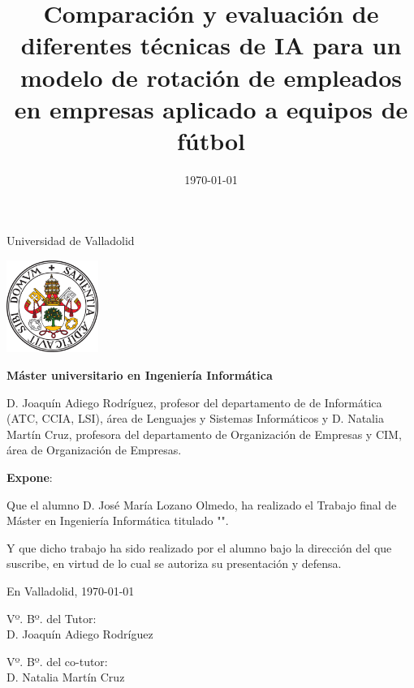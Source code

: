 \documentclass[a4paper,12pt,oneside,oldfontcommands]{memoir}
\title{Comparación y evaluación de diferentes técnicas de IA para un modelo de rotación de empleados en empresas aplicado a equipos de fútbol}
\author{\nombre}
\date{\today}
\newcommand{\nombre}[0]{José María Lozano Olmedo} %
\begin{document}
\maketitle


\newpage\null\thispagestyle{empty}\newpage


\thispagestyle{empty}


\noindent
\begin{center}%
	{\noindent\Huge Universidad de Valladolid}\vspace{.5cm}%
	
\begin{center}%
	\includegraphics[height=3cm]{img/escudoUVA} \hspace{1cm}
\end{center}%

	{\noindent\Large \textbf{Máster universitario en Ingeniería Informática}}\vspace{.5cm}%
\end{center}%



\noindent D. Joaquín Adiego Rodríguez, profesor del departamento de de Informática (ATC, CCIA, LSI), área de Lenguajes y Sistemas Informáticos y D. Natalia Martín Cruz, profesora del departamento de Organización de Empresas y CIM, área de Organización de Empresas.

\noindent \textbf{Expone}:

\noindent Que el alumno D. \nombre, %
ha realizado el Trabajo final de Máster en Ingeniería Informática titulado "\makeatletter\textsc{\@title{}}\makeatother". 

\noindent Y que dicho trabajo ha sido realizado por el alumno bajo la dirección del que suscribe, en virtud de lo cual se autoriza su presentación y defensa.

\begin{center} %
En Valladolid, {\large \today}
\end{center}

\vfill\vfill\vfill



\begin{minipage}{0.45\textwidth}
\begin{flushleft} %
Vº. Bº. del Tutor:\\[2cm]
D. Joaquín Adiego Rodríguez
\end{flushleft}
\end{minipage}
\hfill
\begin{minipage}{0.45\textwidth}
\begin{flushleft} %
Vº. Bº. del co-tutor:\\[2cm]
D. Natalia Martín Cruz
\end{flushleft}
\end{minipage}
\hfill
\end{document}

